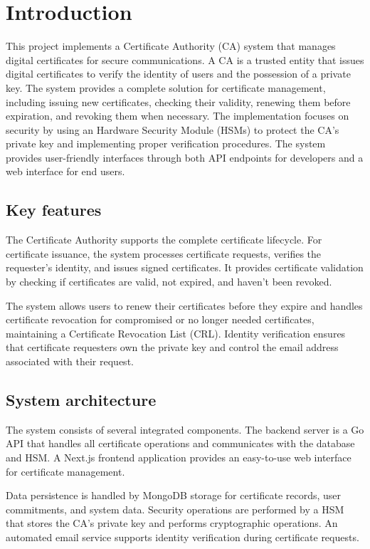 \chapter{Introduction}
\label{ch:introduction}
This project implements a Certificate Authority (CA) system that manages digital certificates for 
secure communications. A CA is a trusted entity that issues digital certificates to verify the identity 
of users and the possession of a private key.
The system provides a complete solution for certificate management, including issuing new certificates, 
checking their validity, renewing them before expiration, and revoking them when necessary. 
The implementation focuses on security by using an Hardware Security Module (HSMs) to protect
the CA's private key and implementing proper verification procedures.
The system provides user-friendly interfaces through both API endpoints for developers and a web 
interface for end users. 

\section{Key features}

The Certificate Authority supports the complete certificate lifecycle. 
For certificate issuance, the system processes certificate requests, verifies the requester's identity, 
and issues signed certificates. 
It provides certificate validation by checking if certificates are valid, not expired, and haven't been revoked.

The system allows users to renew their certificates before they expire and handles certificate revocation 
for compromised or no longer needed certificates, maintaining a Certificate Revocation List (CRL). 
Identity verification ensures that certificate requesters own the private key and control the email 
address associated with their request.

\section{System architecture}

The system consists of several integrated components. The backend server is a Go API that handles 
all certificate operations and communicates with the database and HSM. 
A Next.js frontend application provides an easy-to-use web interface for certificate management.

Data persistence is handled by MongoDB storage for certificate records, user commitments, and system data. 
Security operations are performed by a HSM that stores the CA's private key 
and performs cryptographic operations. 
An automated email service supports identity verification during certificate requests.

